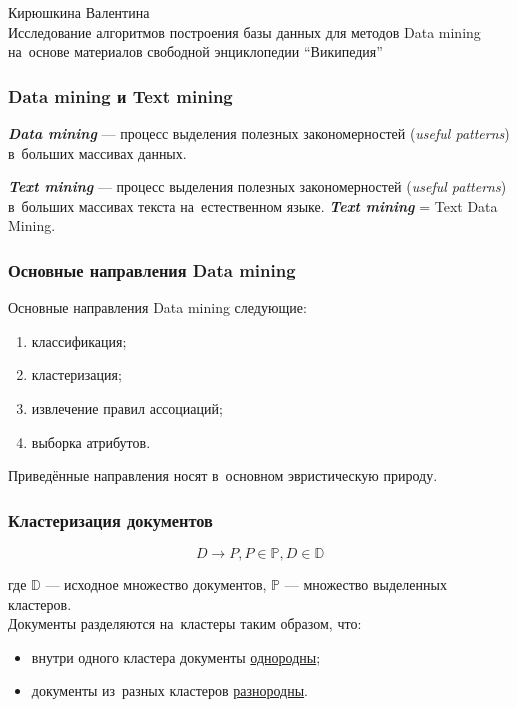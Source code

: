 \documentclass{beamer}
\newcommand{\MARK}[1]{{\bf {\it #1}}}
\begin{document}
\sloppy

\begin{frame}
\begin{center}
Кирюшкина Валентина\\
\vspace{1cm}
{\Large Исследование алгоритмов построения базы данных для методов Data mining\\
на~основе материалов свободной энциклопедии ``Википедия''}
\end{center}
\end{frame}

\begin{frame}
\frametitle{Data mining и Text mining}
\MARK{Data mining} --- процесс выделения полезных закономерностей ({\it useful patterns})  
в~больших массивах данных.

\vspace{1cm}

\MARK{Text mining} --- процесс выделения полезных закономерностей ({\it useful patterns})  
в~больших массивах текста на~естественном языке.
\MARK{Text mining} = Text Data Mining.
\end{frame}

\begin{frame}
\frametitle{Основные направления Data mining}

Основные направления Data mining следующие:

\begin{enumerate}
\item{классификация;}
\item{кластеризация;}
\item{извлечение правил ассоциаций;}
\item{выборка атрибутов.}
\end{enumerate}

Приведённые направления носят в~основном эвристическую природу.
\end{frame}

\begin{frame}
\frametitle{Кластеризация документов}
$$D \to P, P \in \mathbb{P}, D \in \mathbb{D}$$

\vspace{1cm}

где $\mathbb{D}$ --- исходное множество документов, $\mathbb{P}$ --- множество выделенных кластеров.\\
Документы разделяются на~кластеры таким образом, что:

\begin{itemize}
\item{внутри одного кластера документы \underline{однородны};}
\item{документы из~разных кластеров \underline{разнородны}.}
\end{itemize}
\vspace{1cm}
\end{frame}
\end{document}
